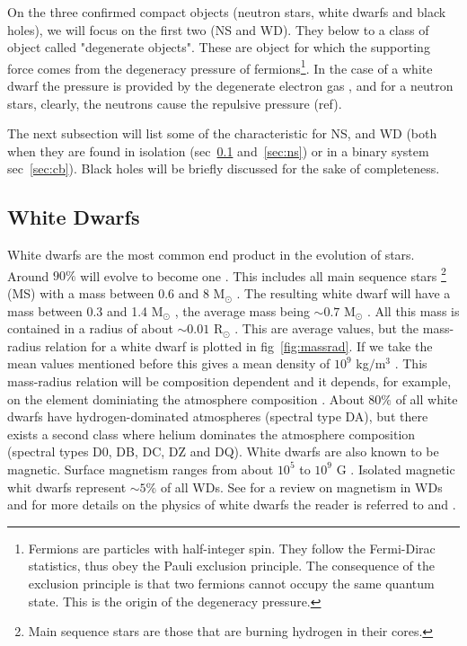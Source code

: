 On the three confirmed compact objects (neutron stars, white dwarfs and black holes), we will focus on the first two (NS and WD). They below to a class of object called "degenerate objects". These are object for which the supporting force comes from the degeneracy pressure of fermions\footnote{Fermions are particles with half-integer spin. They follow the Fermi-Dirac statistics, thus obey the Pauli exclusion principle. The consequence of the exclusion principle is that two fermions cannot occupy the same quantum state. This is the origin of the degeneracy pressure. }. In the case of a white dwarf the pressure is provided by the degenerate electron gas \citep{fowler_dense_1926}, and for a neutron stars, clearly, the neutrons cause the repulsive pressure (ref). 

The next subsection will list some of the characteristic for NS, and WD (both when they are found in isolation (sec~\ref{sec:wd} and~\ref{sec:ns}) or in a binary system sec~\ref{sec:cb}). Black holes will be briefly discussed for the sake of completeness. 


\subsection[White Dwarfs]{White Dwarfs}\label{sec:wd} 

White dwarfs are the most common end product in the evolution of stars. Around $90 \%$ will evolve to become one \citep{koester_white_1980}. This includes all main sequence stars \footnote{Main sequence stars are those that are burning hydrogen in their cores.} (MS) with a mass between $0.6$ and  $8$ M$_\odot$ \citep{koester_physics_1990}. The resulting white dwarf will have a mass between 0.3 and 1.4 M$_\odot$ \citep{prada_moroni_very_2009,chandrasekhar_maximum_1931}, the average mass being $\sim 0.7$ M$_\odot$ \citep{koester_physics_1990}. All this mass is contained in a radius of about $\sim 0.01$ R$_\odot$ \citep{kepler_structure_1995}. This are average values, but the mass-radius relation for a white dwarf is plotted in fig~\ref{fig:massrad}. If we take the mean values mentioned before this gives a mean density of $10^9$ kg$/$m$^3$ . This mass-radius relation will be composition dependent and it depends, for example, on the element dominiating the atmosphere composition \citep{hamada_models_1961}. About $80 \%$ of all white dwarfs have hydrogen-dominated atmospheres (spectral type DA), but there exists a second class where helium dominates the atmosphere composition (spectral types D0, DB, DC, DZ and DQ)\citep{wickramasinghe_magnetism_2000,koester_physics_1990}. White dwarfs are also known to be magnetic. Surface magnetism ranges from about $10^5$ to $10^9$ G \citep{suh_mass-radius_2000}. Isolated magnetic whit dwarfs represent $\sim 5 \%$ of all WDs. See \cite{wickramasinghe_magnetism_2000} for a review on magnetism in WDs and for more details on the physics of white dwarfs the reader is referred to \cite{koester_physics_1990} and \cite{kepler_structure_1995}.

